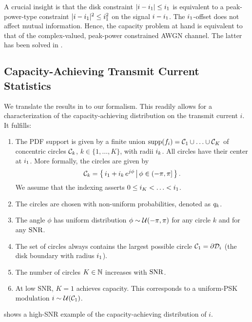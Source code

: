 %

%

A crucial insight is that the disk constraint $|i - i_1| \leq i_1$ is equivalent to a peak-power-type constraint $|i - i_1|^2 \leq i_1^2$ on the signal $i - i_1$. The $i_1$-offset does not affect mutual information. Hence, the capacity problem at hand is equivalent to that of the complex-valued, peak-power constrained AWGN channel. The latter has been solved in \cite{ShamaiTIT1995}.

\subsection{Capacity-Achieving Transmit Current Statistics}
\label{sec:CurrentStats}

We translate the results in \cite{ShamaiTIT1995} to our formalism. This readily allows for a characterization of the capacity-achieving distribution on the transmit current $i$. It fulfills:
\begin{enumerate}
\item
The PDF support is given by a finite union 
$\operatorname*{supp}(f_{i}) = \mathcal{C}_1 \cup \ldots \cup \mathcal{C}_K$
of concentric circles $\mathcal{C}_k$, $k \in \{ 1 , \ldots , K \}$, with radii $i_k$. All circles have their center at $i_1$.
More formally, the circles are given by
\begin{align}
\mathcal{C}_k = \left\{\, i_1 + i_k\, e^{j\phi} \, \big| \, \phi \in (-\pi,\pi] \,\right\} .
\label{eq:CircleDefinition}
\end{align}
We assume that the indexing asserts
$0 \leq i_K < \ldots < i_1$.
\item
The circles are chosen with non-uniform probabilities, denoted as $q_k$.
\item
The angle $\phi$ has uniform distribution
$\phi \sim \mathcal{U}(-\pi,\pi)$
for any circle $k$ and for any $\mathrm{SNR}$.
\item
The set of circles always contains the largest possible circle $\mathcal{C}_1 = \partial\mathcal{D}_i$ (the disk boundary with radius $i_1$).
\item
The number of circles $K \in \mathbb{N}$ increases with $\mathrm{SNR}$.
\item
At low SNR, $K=1$ achieves capacity. This corresponds to a uniform-PSK modulation $i \sim \mathcal{U}(\mathcal{C}_1)$.
\end{enumerate}
%
 shows a high-SNR example of the capacity-achieving distribution of $i$.

